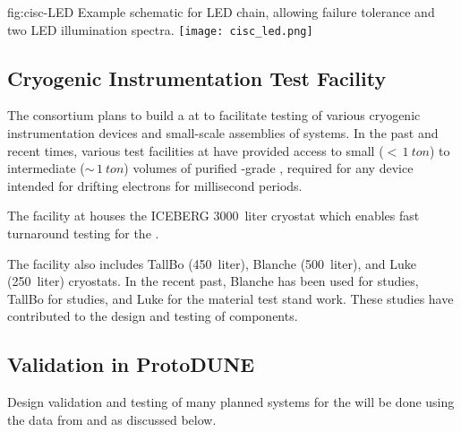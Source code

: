 \begin{dunefigure}{fig:cisc-LED}
  {Example schematic for LED chain, allowing failure tolerance and two LED illumination spectra.}
  \texttt{[image: cisc\_led.png]}
\end{dunefigure}


\subsection{Cryogenic Instrumentation Test Facility}
The  consortium plans to build a  at \fnal to facilitate testing of various cryogenic instrumentation devices and small-scale assemblies of  systems. 
In the past and recent times, various test facilities at \fnal have provided access to small ($<\,\SI{1}{ton}$) to intermediate ($\sim\,\SI{1}{ton}$) volumes of purified -grade , required for %
any device intended for drifting electrons for millisecond periods. 


The  facility at \fnal houses the ICEBERG \SI {3000} {liter} cryostat which enables fast turnaround testing for the  . 

The  facility also includes TallBo (\SI {450} {liter}), Blanche (\SI {500} {liter}), and Luke (\SI {250} {liter}) cryostats. %
In the recent past, Blanche has been used for  studies, TallBo for  studies, and Luke for the material test stand work. These studies have contributed to the design and testing of   components.

\subsection{Validation in ProtoDUNE}
\label{sec:pdsp-cryo-valid}

Design validation and testing of many planned  systems for
the  will be done using the data from
 and  as discussed below.


